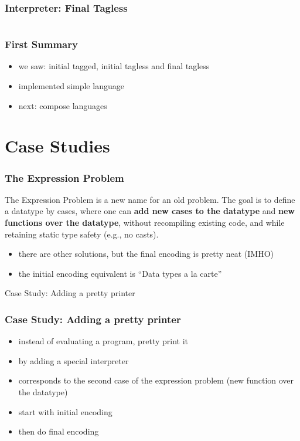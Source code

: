\documentclass[aspectratio=169, hyperref={colorlinks, linkcolor=beamer@centricgreen}, urlcolor=links]{beamer}
\begin{document}
\begin{frame}[fragile]
  \frametitle{Interpreter: Final Tagless}
  \inputminted[fontsize=\footnotesize]{scala}{snippets/final-tagless-interp.scala}
\end{frame}

\begin{frame}
  \frametitle{First Summary}
  \begin{itemize}
  \item we saw: initial tagged, initial tagless and final tagless
  \item implemented simple language
  \item next: compose languages
  \end{itemize}
\end{frame}

\section{Case Studies}\label{sec:case-studies}

\begin{frame}
  \frametitle{The Expression Problem}
  \begin{tcolorbox}[
    fonttitle=\sffamily\bfseries,
    colbacktitle=black,
    colframe=black,
    coltitle=beamer@centricgreen,
    title=Philip Wadler on 12. November 1998
    ]
    The Expression Problem is a new name for an old problem.  The goal
    is to define a datatype by cases, where one can \textbf{add new
      cases to the datatype} and \textbf{new functions over the
      datatype}, without recompiling existing code, and while
    retaining static type safety (e.g., no casts).
  \end{tcolorbox}
  \begin{itemize}
  \item there are other solutions, but the final encoding is
    pretty neat (IMHO)
  \item the initial encoding equivalent is ``Data types a la carte''
  \end{itemize}
\end{frame}

\begin{frame}
  \begin{center}
    \Huge
    Case Study: Adding a pretty printer
  \end{center}
\end{frame}

\begin{frame}
  \frametitle{Case Study: Adding a pretty printer}
  \begin{itemize}
  \item instead of evaluating a program, pretty print it
  \item by adding a special interpreter
  \item corresponds to the second case of the expression problem (new function over the datatype)
  \item start with initial encoding
  \item then do final encoding
  \end{itemize}
\end{frame}
\end{document}
